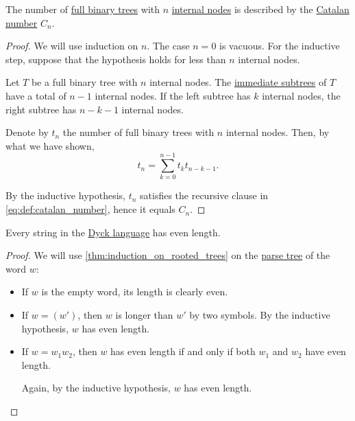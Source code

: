 \begin{proposition}\label{thm:full_binary_tree_count}
  The number of \hyperref[def:n_ary_tree]{full binary trees} with \( n \) \hyperref[def:rooted_tree/internal]{internal nodes} is described by the \hyperref[def:catalan_number]{Catalan number} \( C_n \).
\end{proposition}
\begin{proof}
  We will use induction on \( n \). The case \( n = 0 \) is vacuous. For the inductive step, suppose that the hypothesis holds for less than \( n \) internal nodes.

  Let \( T \) be a full binary tree with \( n \) internal nodes. The \hyperref[def:rooted_tree/subtree]{immediate subtrees} of \( T \) have a total of \( n - 1 \) internal nodes. If the left subtree has \( k \) internal nodes, the right subtree has \( n - k - 1 \) internal nodes.

  Denote by \( t_n \) the number of full binary trees with \( n \) internal nodes. Then, by what we have shown,
  \begin{equation*}
    t_n = \sum_{k=0}^{n-1} t_k t_{n-k-1}.
  \end{equation*}

  By the inductive hypothesis, \( t_n \) satisfies the recursive clause in \eqref{eq:def:catalan_number}, hence it equals \( C_n \).
\end{proof}

\begin{lemma}\label{thm:dyck_language_length}
  Every string in the \hyperref[def:dyck_language]{Dyck language} has even length.
\end{lemma}
\begin{proof}
  We will use \cref{thm:induction_on_rooted_trees} on the \hyperref[def:parse_tree]{parse tree} of the word \( w \):
  \begin{itemize}
    \item If \( w \) is the empty word, its length is clearly even.

    \item If \( w = (w') \), then \( w \) is longer than \( w' \) by two symbols. By the inductive hypothesis, \( w \) has even length.

    \item If \( w = w_1 w_2 \), then \( w \) has even length if and only if both \( w_1 \) and \( w_2 \) have even length.

    Again, by the inductive hypothesis, \( w \) has even length.
  \end{itemize}
\end{proof}

